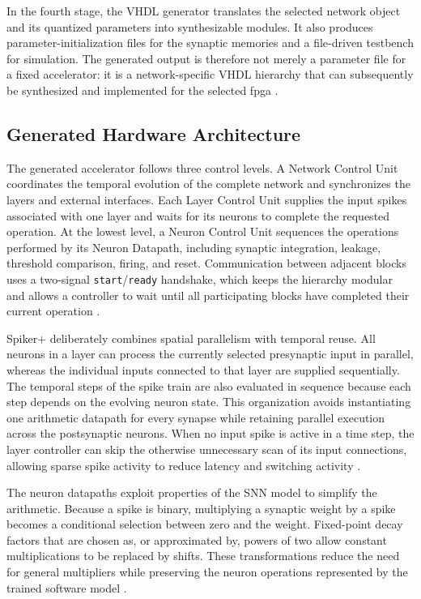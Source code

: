 In the fourth stage, the VHDL generator translates the selected network object and its quantized parameters into synthesizable modules. It also produces parameter-initialization files for the synaptic memories and a file-driven testbench for simulation. The generated output is therefore not merely a parameter file for a fixed accelerator: it is a network-specific VHDL hierarchy that can subsequently be synthesized and implemented for the selected \gls{fpga} \cite{Carpegna2025}.

\subsection{Generated Hardware Architecture}

The generated accelerator follows three control levels. A Network Control Unit coordinates the temporal evolution of the complete network and synchronizes the layers and external interfaces. Each Layer Control Unit supplies the input spikes associated with one layer and waits for its neurons to complete the requested operation. At the lowest level, a Neuron Control Unit sequences the operations performed by its Neuron Datapath, including synaptic integration, leakage, threshold comparison, firing, and reset. Communication between adjacent blocks uses a two-signal \texttt{start}/\texttt{ready} handshake, which keeps the hierarchy modular and allows a controller to wait until all participating blocks have completed their current operation \cite{Carpegna2025}.

Spiker+ deliberately combines spatial parallelism with temporal reuse. All neurons in a layer can process the currently selected presynaptic input in parallel, whereas the individual inputs connected to that layer are supplied sequentially. The temporal steps of the spike train are also evaluated in sequence because each step depends on the evolving neuron state. This organization avoids instantiating one arithmetic datapath for every synapse while retaining parallel execution across the postsynaptic neurons. When no input spike is active in a time step, the layer controller can skip the otherwise unnecessary scan of its input connections, allowing sparse spike activity to reduce latency and switching activity \cite{Carpegna2022,Carpegna2025}.

The neuron datapaths exploit properties of the SNN model to simplify the arithmetic. Because a spike is binary, multiplying a synaptic weight by a spike becomes a conditional selection between zero and the weight. Fixed-point decay factors that are chosen as, or approximated by, powers of two allow constant multiplications to be replaced by shifts. These transformations reduce the need for general multipliers while preserving the neuron operations represented by the trained software model \cite{Carpegna2022,Carpegna2025}.

